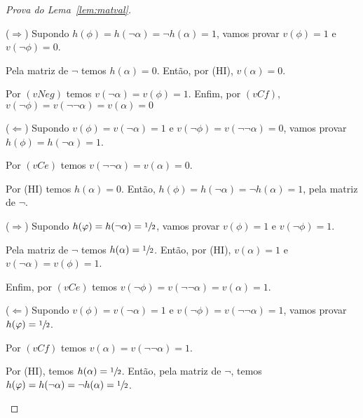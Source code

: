 \begin{proof}[Prova do Lema~\ref{lem:matval}]
\begin{provaporcasos}
                \begin{provaporsubcasos}
                        
                        ($\Longrightarrow$) Supondo $h(\phi) = h(\neg \alpha) = \neg h(\alpha) = 1$, vamos provar $v(\phi) = 1$ e $v(\neg \phi) = 0$. 
                        
                        Pela matriz de $\neg$ temos $h(\alpha) = 0$. Então, por (HI), $v(\alpha) = 0$. 
                        
                        Por $(vNeg)$ temos $v(\neg \alpha) = v(\phi) = 1$. Enfim, por $(vCf)$, $v(\neg \phi) = v(\neg \neg \alpha) = v(\alpha) = 0$
                        
                        
                        ($\Longleftarrow$) Supondo $v(\phi) = v(\neg \alpha) = 1$ e $v(\neg \phi) = v(\neg \neg \alpha) = 0$, vamos provar $h(\phi) = h(\neg \alpha) = 1$.
                        
                        Por $(vCe)$ temos $v(\neg \neg \alpha) = v(\alpha) = 0$.
                        
                        Por (HI) temos $h(\alpha) = 0$. Então, $h(\phi) = h(\neg \alpha) = \neg h(\alpha) = 1$, pela matriz de $\neg$.
                    
                    
                        ($\Longrightarrow$) Supondo $h(\varphi) = h(\neg \alpha) = \sfrac{1}{2}{}$, vamos provar $v(\phi) = 1$ e $v(\neg \phi) = 1$.
                        
                        Pela matriz de $\neg$ temos $h(\alpha) = \sfrac{1}{2}{}$. Então, por (HI), $v(\alpha) = 1$ e $v(\neg \alpha) = v(\phi) = 1$.
                        
                        Enfim, por $(vCe)$ temos $v(\neg \phi) = v(\neg \neg \alpha) = v(\alpha) = 1$.
                        
                        ($\Longleftarrow$) Supondo $v(\phi) = v(\neg \alpha) = 1$ e $v(\neg \phi) = v(\neg \neg \alpha)= 1$, vamos provar $h(\varphi) = \sfrac{1}{2}{}$.

                        Por $(vCf)$ temos $v(\alpha) = v(\neg \neg \alpha) = 1$.
                        
                        Por (HI), temos $h(\alpha) = \sfrac{1}{2}{}$. Então, pela matriz de $\neg$, temos $h(\varphi) = h(\neg \alpha) = \neg h(\alpha) = \sfrac{1}{2}{}$.
                    

\end{provaporsubcasos}
\end{provaporcasos}
\end{proof}
